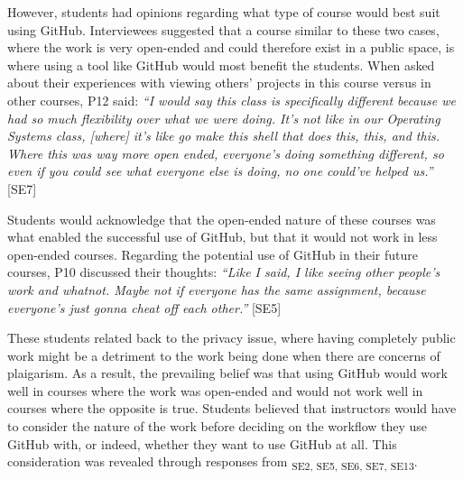 However, students had opinions regarding what type of course would best suit using GitHub. Interviewees suggested that a course similar to these two cases, where the work is very open-ended and could therefore exist in a public space, is where using a tool like GitHub would most benefit the students. When asked about their experiences with viewing others' projects in this course versus in other courses, P12 said: \textit{``I would say this class is specifically different because we had so much flexibility over what we were doing. It's not like in our Operating Systems class, [where] it's like go make this shell that does this, this, and this. Where this was way more open ended, everyone's doing something different, so even if you could see what everyone else is doing, no one could've helped us.''} [SE7]

Students would acknowledge that the open-ended nature of these courses was what enabled the successful use of GitHub, but that it would not work in less open-ended courses. Regarding the potential use of GitHub in their future courses, P10 discussed their thoughts: \textit{``Like I said, I like seeing other people's work and whatnot. Maybe not if everyone has the same assignment, because everyone's just gonna cheat off each other.''} [SE5]



These students related back to the privacy issue, where having completely public work might be a detriment to the work being done when there are concerns of plaigarism. As a result, the prevailing belief was that using GitHub would work well in courses where the work was open-ended and would not work well in courses where the opposite is true. Students believed that instructors would have to consider the nature of the work before deciding on the workflow they use GitHub with, or indeed, whether they want to use GitHub at all. This consideration was revealed through responses from \textsubscript{SE2, SE5, SE6, SE7, SE13}.

